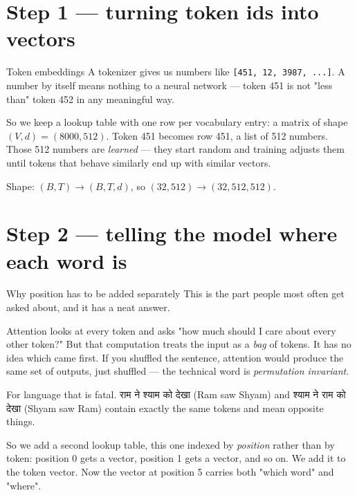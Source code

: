 \documentclass[11pt]{report}
\newcommand{\dn}[1]{{\devanagarifont #1}}
\newcommand{\p}[1]{\texttt{#1}}
\begin{document}
\section{Step 1 --- turning token ids into vectors}

\begin{concept}{Token embeddings}
A tokenizer gives us numbers like \p{[451, 12, 3987, ...]}. A number by itself
means nothing to a neural network --- token 451 is not "less than" token 452 in
any meaningful way.

So we keep a lookup table with one row per vocabulary entry: a matrix of shape
$(V, d) = (8000, 512)$. Token 451 becomes row 451, a list of 512 numbers. Those
512 numbers are \emph{learned} --- they start random and training adjusts them
until tokens that behave similarly end up with similar vectors.

Shape: $(B,T) \to (B,T,d)$, so $(32,512) \to (32,512,512)$.
\end{concept}

\section{Step 2 --- telling the model where each word is}

\begin{concept}{Why position has to be added separately}
This is the part people most often get asked about, and it has a neat answer.

Attention looks at every token and asks "how much should I care about every other
token?" But that computation treats the input as a \emph{bag} of tokens. It has
no idea which came first. If you shuffled the sentence, attention would produce
the same set of outputs, just shuffled --- the technical word is
\emph{permutation invariant}.

For language that is fatal. \dn{राम ने श्याम को देखा} (Ram saw Shyam) and
\dn{श्याम ने राम को देखा} (Shyam saw Ram) contain exactly the same tokens and
mean opposite things.

So we add a second lookup table, this one indexed by \emph{position} rather than
by token: position 0 gets a vector, position 1 gets a vector, and so on. We add
it to the token vector. Now the vector at position 5 carries both "which word"
and "where".
\end{concept}
\end{document}
